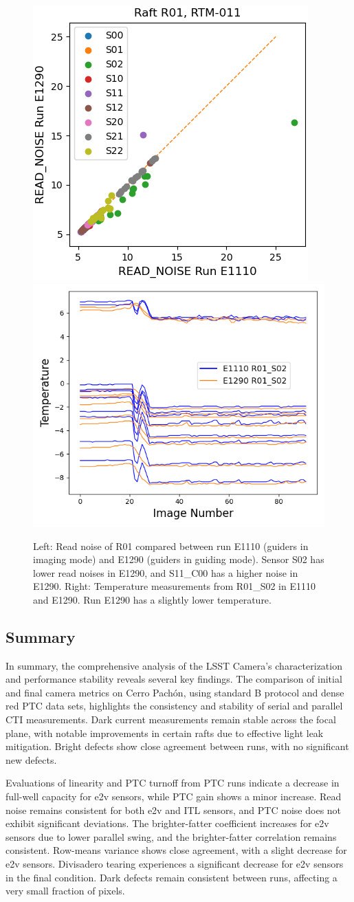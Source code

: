 \begin{figure}[ht]
    \centering
    \includegraphics[width=0.4\linewidth]{figures/E1110_E1290_READ_NOISE_outliers.png}
    \includegraphics[width=0.47\linewidth]{figures/temperature_E1110_E1290.png}
    \caption{Left: Read noise of R01 compared between run E1110 (guiders in imaging mode) and E1290 (guiders in guiding mode). Sensor S02 has lower read noises in E1290, and S11\_C00 has a higher noise in E1290. Right: Temperature measurements from R01\_S02 in E1110 and E1290. Run E1290 has a slightly lower temperature.}
    \label{fig:guider_noise_outliers}
\end{figure}

\clearpage
\subsection{Summary}

In summary, the comprehensive analysis of the LSST Camera's characterization and performance stability reveals several key findings. The comparison of initial and final camera metrics on Cerro Pachón, using standard B protocol and dense red PTC data sets, highlights the consistency and stability of serial and parallel CTI measurements. Dark current measurements remain stable across the focal plane, with notable improvements in certain rafts due to effective light leak mitigation. Bright defects show close agreement between runs, with no significant new defects.

Evaluations of linearity and PTC turnoff from PTC runs indicate a decrease in full-well capacity for e2v sensors, while PTC gain shows a minor increase. Read noise remains consistent for both e2v and ITL sensors, and PTC noise does not exhibit significant deviations. The brighter-fatter coefficient increases for e2v sensors due to lower parallel swing, and the brighter-fatter correlation remains consistent. Row-means variance shows close agreement, with a slight decrease for e2v sensors. Divisadero tearing experiences a significant decrease for e2v sensors in the final condition. Dark defects remain consistent between runs, affecting a very small fraction of pixels.


